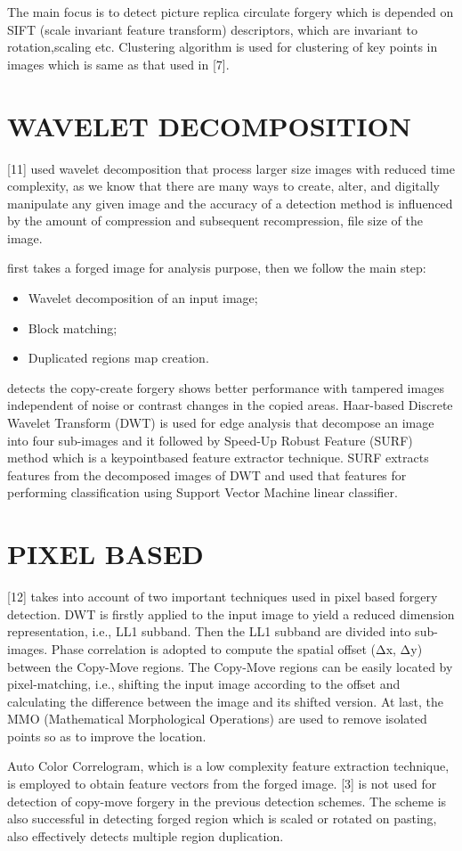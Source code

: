 \bigskip
The main focus is to detect picture replica circulate forgery which is depended on SIFT (scale invariant feature transform) descriptors, which are invariant to rotation,scaling etc. Clustering algorithm is used for clustering of key points in images which is same as that used in [7].
\section{WAVELET DECOMPOSITION}
 [11] used wavelet decomposition that process larger size images with reduced time complexity, as we know that there are many ways to create, alter, and digitally manipulate any given image and the accuracy of a detection method is influenced by the amount of compression and subsequent recompression, file size of the image.

\bigskip
[11] first takes a forged image for analysis purpose, then we follow the main step:
\begin{itemize}
  \item Wavelet decomposition of an input image;
  \item Block matching;
  \item Duplicated regions map creation. 
\end{itemize}  

\bigskip
[14] detects the copy-create forgery shows better performance with tampered images independent of noise or contrast changes in the copied areas. Haar-based Discrete Wavelet Transform (DWT) is used for edge analysis that decompose an image into four sub-images and it followed by Speed-Up Robust Feature (SURF) method which is a keypointbased feature extractor technique. SURF extracts features from the decomposed images of DWT and used that features for performing classification using Support Vector Machine linear classifier.
\section{PIXEL BASED }
[12] takes into account of two important techniques used in pixel based forgery detection. DWT is firstly applied to the input image  to yield  a  reduced dimension  representation, i.e., LL1 subband. Then the LL1 subband are divided into  sub-images.  Phase  correlation  is  adopted  to compute  the  spatial  offset  (Δx,  Δy)  between  the Copy-Move regions. The Copy-Move regions can be easily  located  by  pixel-matching,  i.e.,  shifting  the input  image according  to the  offset and  calculating the  difference  between  the  image  and  its  shifted version.  At  last,  the  MMO  (Mathematical Morphological  Operations)  are  used  to  remove isolated points so as to improve the location.

\bigskip
Auto Color Correlogram, which is a low complexity feature extraction technique, is employed to obtain feature vectors from the forged image. [3] is not used for detection of copy-move forgery in the previous detection schemes. The scheme is also successful in detecting forged region which is scaled or rotated on pasting, also effectively detects multiple region duplication. 





 
